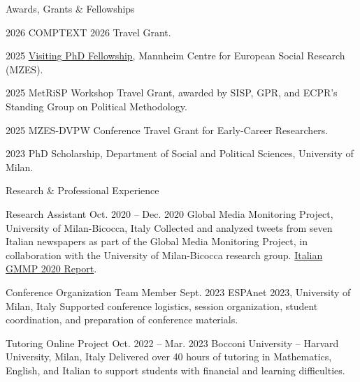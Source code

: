 \documentclass{cv}
\begin{document}
\begin{rSection}{Awards, Grants \& Fellowships}

\begin{datedEntry}{2026}
{COMPTEXT 2026 Travel Grant.}
\end{datedEntry}

\begin{datedEntry}{2025}
{\href{https://www.ipsa.org/na/job-offer/mzes-visiting-fellowship-phd-students}{Visiting PhD Fellowship}, Mannheim Centre for European Social Research (MZES).}
\end{datedEntry}

\begin{datedEntry}{2025}
{MetRiSP Workshop Travel Grant, awarded by SISP, GPR, and ECPR's Standing Group on Political Methodology.}
\end{datedEntry}

\begin{datedEntry}{2025}
{MZES-DVPW Conference Travel Grant for Early-Career Researchers.}
\end{datedEntry}

\begin{datedEntry}{2023}
{PhD Scholarship, Department of Social and Political Sciences, University of Milan.}
\end{datedEntry}

\end{rSection}


\begin{rSection}{Research \& Professional Experience}

\begin{experienceEntry}
{Research Assistant}
{Oct. 2020 -- Dec. 2020}
{Global Media Monitoring Project, University of Milan-Bicocca, Italy}
Collected and analyzed tweets from seven Italian newspapers as part of the Global Media Monitoring Project, in collaboration with the University of Milan-Bicocca research group. \href{https://www.osservatorio.it/wp-content/uploads/2016/03/GMMP-2020-Nationa-Report-Italy.pdf}{Italian GMMP 2020 Report}.
\end{experienceEntry}

\begin{experienceEntry}
{Conference Organization Team Member}
{Sept. 2023}
{ESPAnet 2023, University of Milan, Italy}
Supported conference logistics, session organization, student coordination, and preparation of conference materials.
\end{experienceEntry}

\begin{experienceEntry}
{Tutoring Online Project}
{Oct. 2022 -- Mar. 2023}
{Bocconi University -- Harvard University, Milan, Italy}
Delivered over 40 hours of tutoring in Mathematics, English, and Italian to support students with financial and learning difficulties.
\end{experienceEntry}

\end{rSection}
\end{document}

